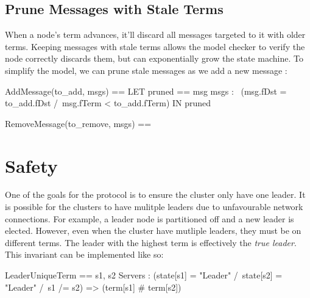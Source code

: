 \documentclass{report}
\begin{document}
\subsection{Prune Messages with Stale Terms}

When a node's term advances, it'll discard all messages targeted to it with
older terms. Keeping messages with stale terms allows the model checker to 
verify the node correctly discards them, but can exponentially grow the state
machine. To simplify the model, we can prune stale messages as we add a new 
message :\newline

\begin{tla}
AddMessage(to_add, msgs) == 
    LET 
        pruned == {msg \in msgs : 
                    ~(msg.fDst = to_add.fDst /\ msg.fTerm < to_add.fTerm)}
    IN
        pruned 

RemoveMessage(to_remove, msgs) ==
\end{tla}
\begin{tlatex}
%
%
%
%
%
\@pvspace{8.0pt}%
%
\end{tlatex}

\section{Safety}

One of the goals for the protocol is to ensure the cluster only have one leader.
It is possible for the clusters to have mulitple leaders due to unfavourable
network connections. For example, a leader node is partitioned off and a new
leader is elected. However, even when the cluster have mutliple leaders, they
must be on different terms. The leader with the highest term is effectively the
\textit{true leader}. This invariant can be implemented like so:\newline

\begin{tla}
LeaderUniqueTerm ==
    \A s1, s2 \in Servers :
        (state[s1] = "Leader" /\ state[s2] = "Leader" /\ s1 /= s2) => (term[s1] # term[s2])
\end{tla}
\begin{tlatex}
%
%
\end{tlatex}
\newline
\end{document}
